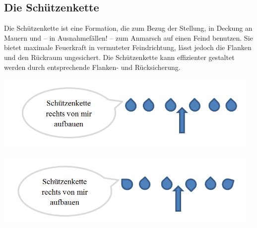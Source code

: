 \subsection{Die Schützenkette}
Die Schützenkette ist eine Formation, die zum Bezug der Stellung, in Deckung an Mauern und -- in Ausnahmefällen! -- zum Anmarsch auf einen Feind benutzen. Sie bietet maximale Feuerkraft in vermuteter Feindrichtung, lässt jedoch die Flanken und den Rückraum ungesichert. Die Schützenkette kann effizienter gestaltet werden durch entsprechende Flanken- und Rücksicherung.\\
\begin{minipage}[t]{1\textwidth}
	\includegraphics[width=13cm]{./img/grundlagen/formationen/Schuetzenkette1.png}
\end{minipage}
\begin{minipage}[t]{1\textwidth}
	\includegraphics[width=13cm]{./img/grundlagen/formationen/Schuetzenkette2.png}
\end{minipage}